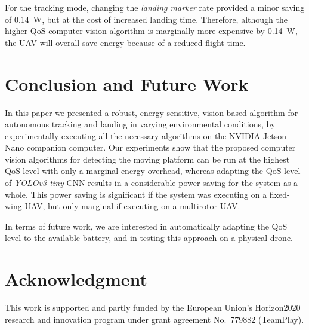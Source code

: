\documentclass[conference]{IEEEtran}
\begin{document}
For the tracking mode, changing the \emph{landing marker} rate
provided a minor saving of \SI{0.14}{\watt}, but at the cost of increased
landing time. Therefore, although the higher-QoS computer vision
algorithm is marginally more expensive by \SI{0.14}{\watt}, the UAV will
overall save energy because of a reduced flight time.

\section{Conclusion and Future Work}
\label{sec:conclusion}

In this paper we presented a robust, energy-sensitive, vision-based
algorithm for autonomous tracking and landing in varying environmental
conditions, by experimentally executing all the necessary algorithms on 
the NVIDIA Jetson Nano companion computer.
%
Our experiments show that the proposed computer vision algorithms for 
detecting the moving platform can be run at the highest QoS level with only a marginal
energy overhead, whereas adapting the QoS level of \emph{YOLOv3-tiny} 
CNN results in a considerable power saving for the system as a whole. 
This power saving is significant if the system was executing on a fixed-wing UAV, %
but only marginal if executing on a multirotor UAV.

In terms of future work, we are interested in automatically adapting
the QoS level to the available battery, and in testing this approach
on a physical drone.

\section*{Acknowledgment}

This work is supported and partly funded by the European Union’s
Horizon2020 research and innovation program under grant agreement
No.~779882 (TeamPlay).


 
\vspace{1ex}
\end{document}
